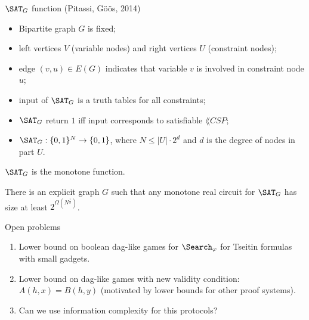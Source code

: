 \begin{frame}{$\SAT_{G}$ function (Pitassi, G{\"{o}}{\"{o}}s, 2014)}

    \begin{itemize}
        \pause
        \item Bipartite graph $G$ is fixed;
        \pause
        \item left vertices $V$ (variable nodes) and right vertices $U$ (constraint nodes);
        \pause
        \item edge $(v, u) \in E(G)$ indicates that variable $v$ is involved in constraint node $u$;
        \pause
        \item input of $\SAT_{G}$ is a truth tables for all constraints;
        \pause
        \item $\SAT_{G}$ return $1$ iff input corresponds to satisfiable $\lang{CSP}$;
        \pause
        \item $\SAT_{G}: \{0, 1\}^N \to \{0, 1\}$, where $N \le |U| \cdot 2^d$ and $d$ is the
            degree of nodes in part $U$.
    \end{itemize}

    $\SAT_{G}$ is the monotone function.

    \pause
    \begin{theorem}
        There is an explicit graph $G$ such that any monotone real circuit for $\SAT_{G}$ has size at
        least $2^{\Omega(N^{\frac{1}{8}})}$.
    \end{theorem}
\end{frame}

\begin{frame}{Open problems}
    \begin{enumerate}
            
        \pause
        \item Lower bound on boolean dag-like games for $\Search_{\varphi}$ for Tseitin formulas with small
            gadgets.
        \pause
        \item Lower bound on dag-like games with new validity condition: $A(h, x) = B(h, y)$ (motivated
            by lower bounds for other proof systems).
        \pause
        \item Can we use information complexity for this protocols?
    \end{enumerate}
\end{frame}